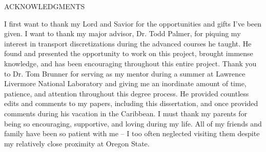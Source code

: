 \documentclass[12pt]{article}
\begin{document}
\begin{center}
ACKNOWLEDGMENTS
\end{center}

I first want to thank my Lord and Savior for the opportunities and gifts I've been given. I want to thank my major advisor, Dr. Todd Palmer, for piquing my interest in transport discretizations during the advanced courses he taught. He found and presented the opportunity to work on this project, brought immense knowledge, and has been encouraging throughout this entire project. Thank you to Dr. Tom Brunner for serving as my mentor during a summer at Lawrence Livermore National Laboratory and giving me an inordinate amount of time, patience, and attention throughout this degree process. He provided countless edits and comments to my papers, including this dissertation, and once provided comments during his vacation in the Caribbean. I must thank my parents for being so encouraging, supportive, and loving during my life. All of my friends and family have been so patient with me -- I too often neglected visiting them despite my relatively close proximity at Oregon State.
\end{document}
